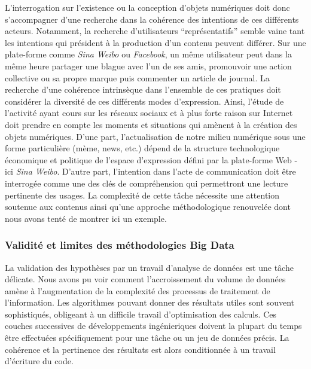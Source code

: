 L'interrogation sur l'existence ou la conception d'objets numériques doit donc s'accompagner d'une recherche dans la cohérence des intentions de ces différents acteurs. Notamment, la recherche d'utilisateurs ``représentatifs'' semble vaine tant les intentions qui président à la production d'un contenu peuvent différer. Sur une plate-forme comme \textit{Sina Weibo} ou \textit{Facebook}, un même utilisateur peut dans la même heure partager une blague avec l'un de ses amis, promouvoir une action collective ou sa propre marque puis commenter un article de journal. La recherche d'une cohérence intrinsèque dans l'ensemble de ces pratiques doit considérer la diversité de ces différents modes d'expression. Ainsi, l'étude de l'activité ayant cours sur les réseaux sociaux et à plus forte raison sur Internet doit prendre en compte les moments et situations qui amènent à la création des objets numériques. D'une part, l'actualisation de notre milieu numérique sous une forme particulière (mème, news, etc.) dépend de la structure technologique économique et politique de l'espace d'expression défini par la plate-forme Web - ici \textit{Sina Weibo}. D'autre part, l'intention dans l'acte de communication doit être interrogée comme une des clés de compréhension qui permettront une lecture pertinente des usages. La complexité de cette tâche nécessite une attention soutenue aux contenus ainsi qu'une approche méthodologique renouvelée dont nous avons tenté de montrer ici un exemple.


\subsubsection[Validité et limites des méthodologies Big Data]{Validité et limites des méthodologies Big Data}


La validation des hypothèses par un travail d'analyse de données est une tâche délicate. Nous avons pu voir comment l'accroissement du volume de données amène à l'augmentation de la complexité des processus de traitement de l'information. Les algorithmes pouvant donner des résultats utiles sont souvent sophistiqués, obligeant à un difficile travail d'optimisation des calculs. Ces couches successives de développements ingénieriques doivent la plupart du temps être effectuées spécifiquement pour une tâche ou un jeu de données précis. La cohérence et la pertinence des résultats est alors conditionnée à un travail d'écriture du code. 

